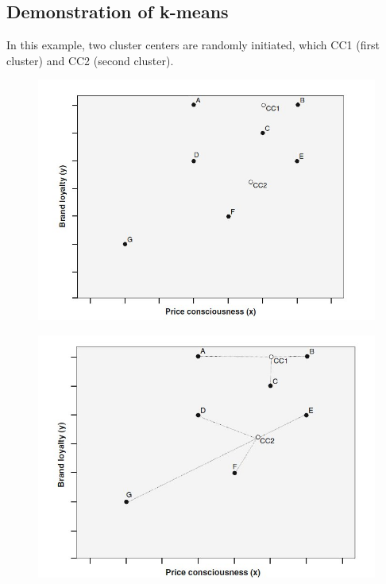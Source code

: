 \documentclass[a4paper,12pt]{article}
\begin{document}
\subsection{Demonstration of k-means}
In this example, two cluster centers are randomly
initiated, which CC1 (first cluster) and CC2 (second cluster).
\begin{figure}[h!]
	\begin{center}
		\includegraphics[scale=0.4]{images/kmeans1.jpg}\\
	\end{center}
\end{figure}
\begin{figure}[h!]
	\begin{center}
		\includegraphics[scale=0.4]{images/kmeans2.jpg}\\
	\end{center}
\end{figure}
\end{document}
